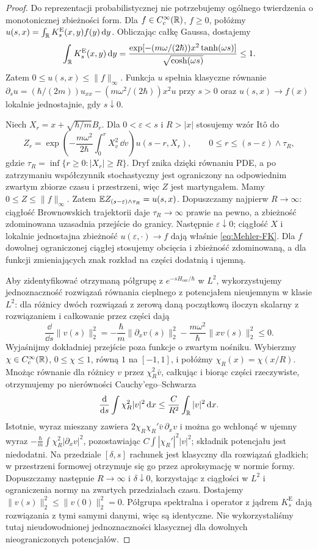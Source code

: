 \begin{proof}
Do reprezentacji probabilistycznej nie potrzebujemy
ogólnego twierdzenia o monotonicznej zbieżności form.
Dla $f\in C_c^\infty(\mathbb{R})$, $f\ge0$, połóżmy
$u(s,x)=\int_{\mathbb{R}}K_s^{\mathrm E}(x,y)f(y)\,\mathrm{d} y$.
Obliczając całkę Gaussa, dostajemy
\[
 \int_{\mathbb{R}} K_s^{\mathrm E}(x,y)\,\mathrm{d} y
 =\frac{\exp[-(m\omega/(2\hbar))x^2\tanh(\omega s)]}
        {\sqrt{\cosh(\omega s)}}\le1.
\]
Zatem $0\le u(s,x)\le\|f\|_\infty$.
Funkcja $u$ spełnia klasyczne równanie
$\partial_su=(\hbar/(2m))u_{xx}-(m\omega^2/(2\hbar))x^2u$
przy $s>0$ oraz $u(s,x)\to f(x)$ lokalnie jednostajnie,
gdy $s\downarrow0$.

Niech $X_r=x+\sqrt{\hbar/m}B_r$. Dla
$0<\varepsilon<s$ i $R>|x|$ stosujemy wzór Itô do
\[
 Z_r=\exp\left(-\frac{m\omega^2}{2\hbar}
 \int_0^rX_v^2\,\dd v\right)u(s-r,X_r),
 \qquad 0\le r\le(s-\varepsilon)\wedge\tau_R,
\]
gdzie $\tau_R=\inf\{r\ge0:|X_r|\ge R\}$.
Dryf znika dzięki równaniu PDE, a po zatrzymaniu
współczynnik stochastyczny jest ograniczony na
odpowiednim zwartym zbiorze czasu i przestrzeni,
więc $Z$ jest martyngałem. Mamy $0\le Z\le\|f\|_\infty$.
Zatem $\mathbb{E} Z_{(s-\varepsilon)\wedge\tau_R}=u(s,x)$.
Dopuszczamy najpierw $R\to\infty$: ciągłość Brownowskich
trajektorii daje $\tau_R\to\infty$ prawie na pewno,
a zbieżność zdominowana uzasadnia przejście do granicy.
Następnie $\varepsilon\downarrow0$; ciągłość $X$ i
lokalnie jednostajna zbieżność $u(\varepsilon,\cdot)\to f$
dają właśnie \eqref{eq:Mehler-FK}.
Dla $f$ dowolnej ograniczonej ciągłej stosujemy obcięcia
i zbieżność zdominowaną, a dla funkcji zmieniających znak
rozkład na części dodatnią i ujemną.

Aby zidentyfikować otrzymaną półgrupę z
$e^{-sH_{\mathrm{osc}}/\hbar}$ w $L^2$, wykorzystujemy
jednoznaczność rozwiązań równania cieplnego z
potencjałem nieujemnym w klasie $L^2$: dla różnicy
dwóch rozwiązań z zerową daną początkową iloczyn skalarny
z rozwiązaniem i całkowanie przez części dają
\[
 \frac{\dd}{\dd s}\|v(s)\|_2^2
 =-\frac{\hbar}{m}\|\partial_xv(s)\|_2^2
  -\frac{m\omega^2}{\hbar}\|xv(s)\|_2^2\le0.
\]
Wyjaśnijmy dokładniej przejście poza funkcje o zwartym
nośniku. Wybierzmy $\chi\in C_c^\infty(\mathbb{R})$, $0\le\chi\le1$,
równą $1$ na $[-1,1]$, i połóżmy $\chi_R(x)=\chi(x/R)$.
Mnożąc równanie dla różnicy $v$ przez $\chi_R^2\bar v$,
całkując i biorąc części rzeczywiste, otrzymujemy po
nierówności Cauchy'ego--Schwarza
\[
\frac{\mathrm{d}}{\mathrm{d} s}\int\chi_R^2|v|^2\,\mathrm{d} x
\le \frac{C}{R^2}\int_{\mathbb{R}}|v|^2\,\mathrm{d} x.
\]
Istotnie, wyraz mieszany zawiera
$2\chi_R\chi_R'\bar v\,\partial_xv$ i można go
wchłonąć w ujemny wyraz
$-\frac{\hbar}{m}\int\chi_R^2|\partial_xv|^2$,
pozostawiając $C\int|\chi_R'|^2|v|^2$;
składnik potencjału jest niedodatni. Na przedziale
$[\delta,s]$ rachunek jest klasyczny dla rozwiązań
gładkich; w przestrzeni formowej otrzymuje się go przez
aproksymację w normie formy. Dopuszczamy następnie
$R\to\infty$ i $\delta\downarrow0$, korzystając z
ciągłości w $L^2$ i ograniczenia normy na zwartych
przedziałach czasu. Dostajemy
$\|v(s)\|_2^2\le\|v(0)\|_2^2=0$.
Półgrupa spektralna i operator z jądrem $K_s^{\mathrm E}$
dają rozwiązania z tymi samymi danymi, więc są identyczne.
Nie wykorzystaliśmy tutaj nieudowodnionej jednoznaczności
klasycznej dla dowolnych nieograniczonych potencjałów.
\end{proof}

